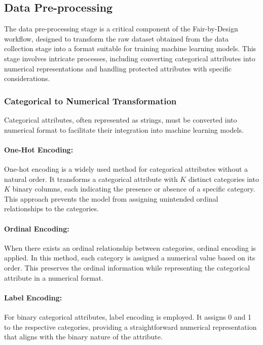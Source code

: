 \subsection{Data Pre-processing}
\label{subsection:data_pre_proc}

The data pre-processing stage is a critical component of the Fair-by-Design workflow, designed to transform the raw dataset obtained from the data collection stage into a format suitable for training machine learning models. This stage involves intricate processes, including converting categorical attributes into numerical representations and handling protected attributes with specific considerations.

\subsubsection{Categorical to Numerical Transformation}

Categorical attributes, often represented as strings, must be converted into numerical format to facilitate their integration into machine learning models.

\paragraph{One-Hot Encoding:}
One-hot encoding is a widely used method for categorical attributes without a natural order. It transforms a categorical attribute with \(K\) distinct categories into \(K\) binary columns, each indicating the presence or absence of a specific category. This approach prevents the model from assigning unintended ordinal relationships to the categories.

\paragraph{Ordinal Encoding:}
When there exists an ordinal relationship between categories, ordinal encoding is applied. In this method, each category is assigned a numerical value based on its order. This preserves the ordinal information while representing the categorical attribute in a numerical format.

\paragraph{Label Encoding:}
For binary categorical attributes, label encoding is employed. It assigns 0 and 1 to the respective categories, providing a straightforward numerical representation that aligns with the binary nature of the attribute.

